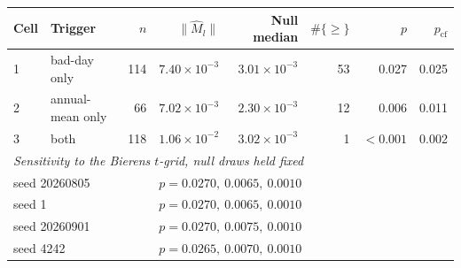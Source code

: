 \begin{tabular}{llrrrrrr}
\toprule
Cell & Trigger & $n$ & $\|\hat M_l\|$ & Null median & $\#\{\ge\}$ & $p$ & $p_{\mathrm{cf}}$ \\
\midrule
1 & bad-day only & 114 & $7.40 \times 10^{-3}$ & $3.01 \times 10^{-3}$ & 53 & 0.027 & 0.025 \\
2 & annual-mean only & 66 & $7.02 \times 10^{-3}$ & $2.30 \times 10^{-3}$ & 12 & 0.006 & 0.011 \\
3 & both & 118 & $1.06 \times 10^{-2}$ & $3.02 \times 10^{-3}$ & 1 & $<0.001$ & 0.002 \\
\midrule
\multicolumn{8}{l}{\textit{Sensitivity to the Bierens $t$-grid, null draws held fixed}} \\
\multicolumn{3}{l}{seed 20260805} & \multicolumn{5}{l}{$p = 0.0270,\ 0.0065,\ 0.0010$} \\
\multicolumn{3}{l}{seed 1} & \multicolumn{5}{l}{$p = 0.0270,\ 0.0065,\ 0.0010$} \\
\multicolumn{3}{l}{seed 20260901} & \multicolumn{5}{l}{$p = 0.0270,\ 0.0075,\ 0.0010$} \\
\multicolumn{3}{l}{seed 4242} & \multicolumn{5}{l}{$p = 0.0265,\ 0.0070,\ 0.0010$} \\
\bottomrule
\end{tabular}
